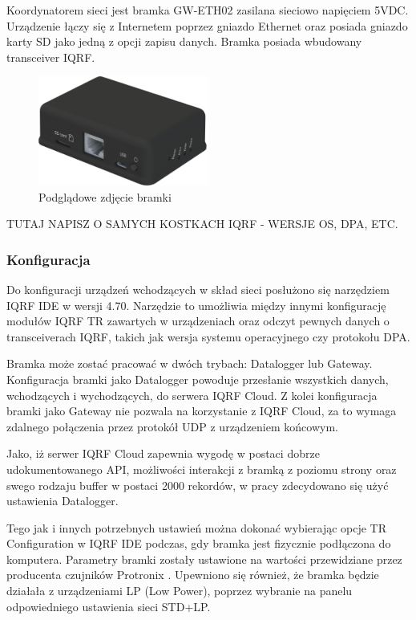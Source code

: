 \documentclass[a4paper, 12pt]{article}
\begin{document}
Koordynatorem sieci jest bramka GW-ETH02 zasilana sieciowo napięciem 5VDC. Urządzenie łączy się z Internetem poprzez gniazdo Ethernet oraz
posiada gniazdo karty SD jako jedną z opcji zapisu danych. Bramka posiada wbudowany transceiver IQRF.

\begin{figure}[H]
    \centering
    \includegraphics[width=0.5\textwidth]{zdj/gateway.png}
    \caption{Podglądowe zdjęcie bramki}
\end{figure}

TUTAJ NAPISZ O SAMYCH KOSTKACH IQRF - WERSJE OS, DPA, ETC.

\subsubsection{Konfiguracja}

Do konfiguracji urządzeń wchodzących w skład sieci posłużono się narzędziem IQRF IDE w wersji 4.70. Narzędzie to umożliwia między 
innymi konfigurację modułów IQRF TR zawartych w urządzeniach oraz odczyt pewnych danych o transceiverach IQRF, takich jak wersja systemu
operacyjnego czy protokołu DPA.

Bramka może zostać pracować w dwóch trybach: Datalogger lub Gateway. Konfiguracja bramki jako Datalogger powoduje przesłanie wszystkich danych,
wchodzących i wychodzących, do serwera IQRF Cloud. Z kolei konfiguracja bramki jako Gateway nie pozwala na korzystanie z IQRF Cloud, za to wymaga 
zdalnego połączenia przez protokół UDP z urządzeniem końcowym.

Jako, iż serwer IQRF Cloud zapewnia wygodę w postaci dobrze udokumentowanego API, możliwości interakcji z bramką z poziomu strony oraz swego
rodzaju buffer w postaci 2000 rekordów, w pracy zdecydowano się użyć ustawienia Datalogger.

Tego jak i innych potrzebnych ustawień można dokonać wybierając opcje TR Configuration w IQRF IDE podczas, gdy bramka jest fizycznie podłączona
do komputera. Parametry bramki zostały ustawione na wartości przewidziane przez producenta czujników Protronix \cite{protronix-comms}. Upewniono 
się również, że bramka będzie działała z urządzeniami LP (Low Power), poprzez wybranie na panelu odpowiedniego ustawienia sieci STD+LP.
\end{document}
